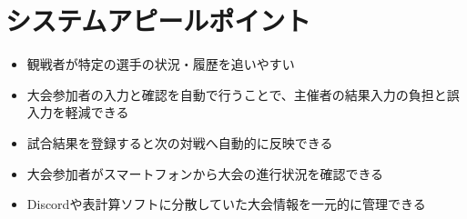 \section{システムアピールポイント}

\begin{itemize}
    \item 観戦者が特定の選手の状況・履歴を追いやすい
    \item 大会参加者の入力と確認を自動で行うことで、主催者の結果入力の負担と誤入力を軽減できる
    \item 試合結果を登録すると次の対戦へ自動的に反映できる
    \item 大会参加者がスマートフォンから大会の進行状況を確認できる
    \item Discordや表計算ソフトに分散していた大会情報を一元的に管理できる
\end{itemize}
